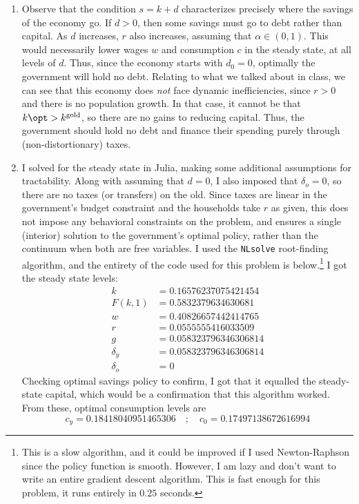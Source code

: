 \documentclass[10pt]{article}
\begin{document}
\begin{enumerate}
	\item Observe that the condition $s = k+d$ characterizes precisely where the savings of the economy go. If $d > 0$, then some savings must go to debt rather than capital. As $d$ increases, $r$ also increases, assuming that $\alpha \in (0,1)$. This would necessarily lower wages $w$ and consumption $c$ in the steady state, at all levels of $d$. Thus, since the economy starts with $d_0 = 0$, optimally the government will hold no debt. Relating to what we talked about in class, we can see that this economy does \emph{not} face dynamic inefficiencies, since $r > 0$ and there is no population growth. In that case, it cannot be that $k\opt > k^{\text{gold}}$, so there are no gains to reducing capital. Thus, the government should hold no debt and finance their spending purely through (non-distortionary) taxes.
	\item I solved for the steady state in Julia, making some additional assumptions for tractability. Along with assuming that $d = 0$, I also imposed that $\delta_o = 0$, so there are no taxes (or transfers) on the old. Since taxes are linear in the government's budget constraint and the households take $r$ as given, this does not impose any behavioral constraints on the problem, and ensures a single (interior) solution to the government's optimal policy, rather than the continuum when both are free variables. I used the \texttt{NLsolve} root-finding algorithm, and the entirety of the code used for this problem is below.\footnote{This is a slow algorithm, and it could be improved if I used Newton-Raphson since the policy function is smooth. However, I am lazy and don't want to write an entire gradient descent algorithm. This is fast enough for this problem, it runs entirely in $0.25$ seconds.} I got the steady state levels:\begin{align*}k &= 0.16576237075421454 \\ F(k,1) &= 0.5832379634630681 \\ w &= 0.40826657442414765 \\ r &= 0.0555555416033509 \\ g &= 0.058323796346306814 \\ \delta_y &= 0.058323796346306814 \\ \delta_o &= 0 \end{align*}Checking optimal savings policy to confirm, I got that it equalled the steady-state capital, which would be a confirmation that this algorithm worked. From these, optimal consumption levels are \[c_y = 0.18418040951465306 \quad ; \quad c_0 = 0.17497138672616994\]

\end{enumerate}
\end{document}
